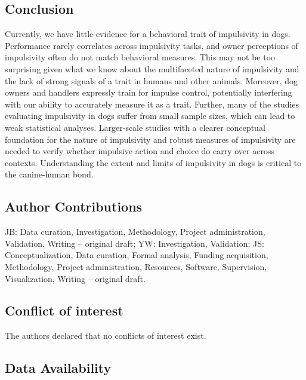 \documentclass[
  ,pub,floatsintext]{apa6}
\begin{document}
\hypertarget{conclusion}{%
\subsection{Conclusion}\label{conclusion}}

Currently, we have little evidence for a behavioral trait of impulsivity in dogs. Performance rarely correlates across impulsivity tasks, and owner perceptions of impulsivity often do not match behavioral measures. This may not be too surprising given what we know about the multifaceted nature of impulsivity and the lack of strong signals of a trait in humans and other animals. Moreover, dog owners and handlers expressly train for impulse control, potentially interfering with our ability to accurately measure it as a trait. Further, many of the studies evaluating impulsivity in dogs suffer from small sample sizes, which can lead to weak statistical analyses. Larger-scale studies with a clearer conceptual foundation for the nature of impulsivity and robust measures of impulsivity are needed to verify whether impulsive action and choice do carry over across contexts. Understanding the extent and limits of impulsivity in dogs is critical to the canine-human bond.

\hypertarget{author-contributions}{%
\subsection{Author Contributions}\label{author-contributions}}

JB: Data curation, Investigation, Methodology, Project administration, Validation, Writing -- original draft; YW: Investigation, Validation; JS: Conceptualization, Data curation, Formal analysis, Funding acquisition, Methodology, Project administration, Resources, Software, Supervision, Visualization, Writing -- original draft.

\hypertarget{conflict-of-interest}{%
\subsection{Conflict of interest}\label{conflict-of-interest}}

The authors declared that no conflicts of interest exist.

\hypertarget{data-availability}{%
\subsection{Data Availability}\label{data-availability}}
\end{document}

